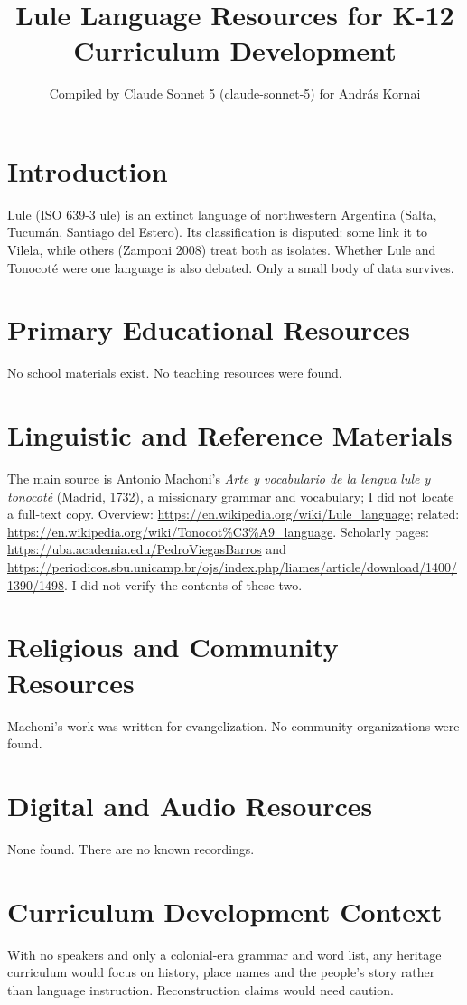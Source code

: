 \documentclass[12pt]{article}
\title{Lule Language Resources for K-12 Curriculum Development}
\author{Compiled by Claude Sonnet 5 (claude-sonnet-5) for Andr\'as Kornai}
\date{}
\begin{document}
\maketitle
\section{Introduction}
Lule (ISO 639-3 ule) is an extinct language of northwestern Argentina (Salta, Tucum\'an, Santiago del Estero). Its classification is disputed: some link it to Vilela, while others (Zamponi 2008) treat both as isolates. Whether Lule and Tonocot\'e were one language is also debated. Only a small body of data survives.
\section{Primary Educational Resources}
No school materials exist. No teaching resources were found.
\section{Linguistic and Reference Materials}
The main source is Antonio Machoni's \emph{Arte y vocabulario de la lengua lule y tonocot\'e} (Madrid, 1732), a missionary grammar and vocabulary; I did not locate a full-text copy. Overview: \url{https://en.wikipedia.org/wiki/Lule_language}; related: \url{https://en.wikipedia.org/wiki/Tonocot%C3%A9_language}. Scholarly pages: \url{https://uba.academia.edu/PedroViegasBarros} and \url{https://periodicos.sbu.unicamp.br/ojs/index.php/liames/article/download/1400/1390/1498}. I did not verify the contents of these two.
\section{Religious and Community Resources}
Machoni's work was written for evangelization. No community organizations were found.
\section{Digital and Audio Resources}
None found. There are no known recordings.
\section{Curriculum Development Context}
With no speakers and only a colonial-era grammar and word list, any heritage curriculum would focus on history, place names and the people's story rather than language instruction. Reconstruction claims would need caution.
\end{document}
